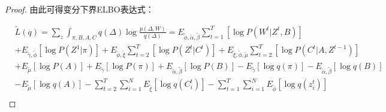 \begin{proof}
	
	
	
	由此可得变分下界ELBO表达式：
	
	\begin{equation}
		\label{appendix:eq:3}
		\begin{split}
			&\widetilde{L}(q) = \sum_z \int_{\pi,B,A,C} q(\Delta) \log \frac{p(\Delta,W)}{q(\Delta)} 
			= E_{\widetilde{\phi},\widetilde{\alpha},\widetilde{\beta}} \sum_{t=1}^T [\log P(W^t|Z^t,B)] \\
			&+ E_{\widetilde{\gamma},\widetilde{\phi}}[\log P(Z^1|\pi)] + E_{\widetilde{\phi},\widetilde{\xi}} \sum_{t=2}^T [\log P(Z^t|C^t)] 
			+ E_{\widetilde{\xi},\widetilde{\phi},\widetilde{\mu}} \sum_{t=2}^T [\log P(C^t|A,Z^{t-1})] \\
			&+ E_{\widetilde{\mu}}[\log P(A)] + E_{\widetilde{\gamma}}[\log P(\pi)] + E_{\widetilde{\alpha},\widetilde{\beta}}[\log P(B)] 
			- E_{\widetilde{\gamma}}[\log q(\pi)] - E_{\widetilde{\alpha},\widetilde{\beta}}[\log q(B)]  \\
			&- E_{\widetilde{\mu}}[\log q(A)]- \sum_{t=2}^T \sum_{i=1}^N E_{\widetilde{\xi}}[\log q(C_i^t)] - \sum_{t=1}^T \sum_{i=1}^N E_{\widetilde{\phi}}[\log q(z_i^t)] \\
		\end{split}
	\end{equation}
	

\end{proof}
